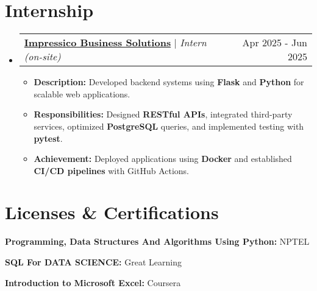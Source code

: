 \documentclass[letterpaper,11pt]{article}
\makeatletter
\newcommand{\resumeItem}[1]{
  \item\small{
    {#1 \vspace{-2pt}}
  }
}
\newcommand{\resumeProjectHeading}[2]{
    \item
    \begin{tabular*}{0.97\textwidth}{l@{\extracolsep{\fill}}r}
      \small#1 & #2 \\
    \end{tabular*}\vspace{-7pt}
}
\newcommand{\resumeSubHeadingListStart}{\begin{itemize}[leftmargin=0.15in, label={}]}
\newcommand{\resumeSubHeadingListEnd}{\end{itemize}}
\newcommand{\resumeItemListStart}{\begin{itemize}}
\newcommand{\resumeItemListEnd}{\end{itemize}\vspace{-5pt}}
\makeatother
\begin{document}
\section{Internship}
    \resumeSubHeadingListStart
      \resumeProjectHeading
          {\textbf{\href{https://www.impressico.com/}{Impressico Business Solutions}} $|$ \footnotesize\emph{Intern (on-site)}}{Apr 2025 - Jun 2025}
          \resumeItemListStart
            \resumeItem{\textbf{Description:} Developed backend systems using \textbf{Flask} and \textbf{Python} for scalable web applications.}
            \resumeItem{\textbf{Responsibilities:} Designed \textbf{RESTful APIs}, integrated third-party services, optimized \textbf{PostgreSQL} queries, and implemented testing with \textbf{pytest}.}
            \resumeItem{\textbf{Achievement:} Deployed applications using \textbf{Docker} and established \textbf{CI/CD pipelines} with GitHub Actions.}
          \resumeItemListEnd
    \resumeSubHeadingListEnd

\section{Licenses \& Certifications}
\begin{itemize}[leftmargin=0.15in, label={}, itemsep=0pt]
    \small{\item \textbf{Programming, Data Structures And Algorithms Using Python:} NPTEL}
    \small{\item \textbf{SQL For DATA SCIENCE:} Great Learning}
    \small{\item \textbf{Introduction to Microsoft Excel:} Coursera}
\end{itemize}
\end{document}
